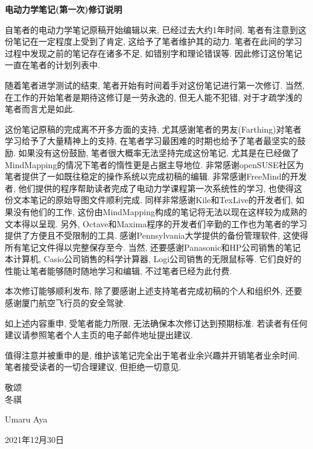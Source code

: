 


 \begin{center} 
 \Large \textbf{电动力学笔记(第一次)修订说明}
\end{center}
 
\large 
\quad 自笔者的电动力学笔记原稿开始编辑以来, 已经过去大约1年时间. 笔者有注意到这份笔记在一定程度上受到了肯定, 这给予了笔者维护其的动力. 笔者在此间的学习过程中发现之前的笔记存在诸多不足, 如错别字和理论错误等. 因此修订这份笔记一直在笔者的计划列表中. \par

\quad 随着笔者进学测试的结束, 笔者开始有时间着手对这份笔记进行第一次修订. 当然, 在工作的开始笔者是期待这修订是一劳永逸的, 但无人能不犯错, 对于才疏学浅的笔者而言尤是如此.\par

\quad 这份笔记原稿的完成离不开多方面的支持, 尤其感谢笔者的男友(Farthing)对笔者学习给予了大量精神上的支持, 在笔者学习最困难的时期也给予了笔者最坚实的鼓励. 如果没有这份鼓励, 笔者很大概率无法坚持完成这份笔记, 尤其是在已经做了MindMapping的情况下笔者的惰性更是占据主导地位. 非常感谢openSUSE社区为笔者提供了一如既往稳定的操作系统以完成初稿的编辑. 非常感谢FreeMind的开发者, 他们提供的程序帮助读者完成了电动力学课程第一次系统性的学习, 也使得这份文本笔记的原始导图文件顺利完成. 同样非常感谢Kile和TexLive的开发者们, 如果没有他们的工作, 这份由MindMapping构成的笔记将无法以现在这样较为成熟的文本得以呈现. 另外, Octave和Maxima程序的开发者们辛勤的工作也为笔者的学习提供了方便且不受限制的工具. 感谢Pennsylvania大学提供的备份管理软件, 这使得所有笔记文件得以完整保存至今. 当然, 还要感谢Panasonic和HP公司销售的笔记本计算机, Casio公司销售的科学计算器, Logi公司销售的无限鼠标等. 它们良好的性能让笔者能够随时随地学习和编辑, 不过笔者已经为此付费.\par

\quad 本次修订能够顺利发布, 除了要感谢上述支持笔者完成初稿的个人和组织外, 还要感谢厦门航空飞行员的安全驾驶. \par

\quad 如上述内容重申, 受笔者能力所限, 无法确保本次修订达到预期标准. 若读者有任何建议请参照笔者个人主页的电子邮件地址提出建议. \par

\quad 值得注意并被重申的是, 维护该笔记完全出于笔者业余兴趣并开销笔者业余时间. 笔者接受读者的一切合理建议, 但拒绝一切意见. \par

\quad \par

\quad 敬颂 \\
冬祺\par

\quad\par
\quad\par

\quad Umaru Aya\par
2021年12月30日\par


